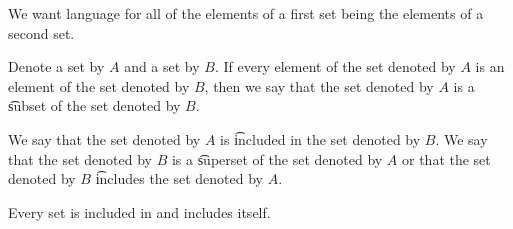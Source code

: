 

We want language for all of the elements of a first set being the elements of a second set.


Denote a set by $A$ and a set by $B$.
If every element of the set denoted by $A$ is an element of the set denoted by $B$, then we say that the set denoted by $A$ is a \t{subset} of the set denoted by $B$.

We say that the set denoted by $A$ is \t{included} in the set denoted by $B$.
We say that the set denoted by $B$ is a \t{superset} of the set denoted by $A$ or that the set denoted by $B$ \t{includes} the set denoted by $A$.

Every set is included in and includes itself.




